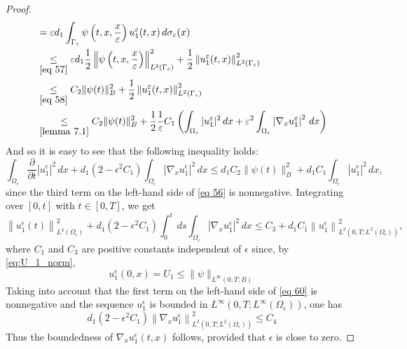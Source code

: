 \begin{proof}
\begin{equation*}
\begin{aligned}
    &=\epsilon d_{1} \int_{\Gamma_{\epsilon}} \psi\left(t, x, \frac{x}{\epsilon}\right) u_{1}^{\epsilon}(t, x) \, {d} \sigma_{\epsilon}(x) \\
    &\underset{\eqref{eq 57}}{\leq} \epsilon d_{1} \frac{1}{2}\left\|\psi\left(t, x, \frac{x}{\epsilon}\right)\right\|_{L^{2}\left(\Gamma_{\epsilon}\right)}^{2}+\frac{1}{2}\left\|u_{1}^{\epsilon}(t, x)\right\|_{L^{2}\left(\Gamma_{\epsilon}\right)}^{2} \\ 
    &\underset{\eqref{eq 58}}{\leq} C_{2}\|\psi(t)\|_{B}^{2} +\frac{1}{2}\left\|u_{1}^{\epsilon}(t, x)\right\|_{L^{2}\left(\Gamma_{\epsilon}\right)}^{2}\\
    &\underset{\eqref{lemma 7.1}}{\leq}  C_{2}\|\psi(t)\|_{B}^{2} + \frac{1}{2}\frac{1}{\epsilon}C_{1}\left( \int_{\Omega_{\epsilon}}|u_{1}^{\epsilon}|^{2} \, {d} x+{\epsilon^2}\int_{\Omega_{\epsilon}}\left|\nabla_{x} u_{1}^{\epsilon}\right|^{2} \, {d} x\right)
\end{aligned}
\end{equation*}
And so it is easy to see that the following inequality holds:
\begin{equation}
\int_{\Omega_{\epsilon}} \frac{\partial}{\partial t}\left|u_{1}^{\epsilon}\right|^{2} \, d  x+d_{1}\left(2-\epsilon^{2} C_{1}\right) \int_{\Omega_{\epsilon}}\left|\nabla_{x} u_{1}^{\epsilon}\right|^{2} \, {d} x\leq d_{1} C_{2}\|\psi(t)\|_{B}^{2}+d_{1} C_{1} \int_{\Omega_{\epsilon}}\left|u_{1}^{\epsilon}\right|^{2} \,{d} x,
\label{eq 59}\end{equation}
since the third term on the left-hand side of \eqref{eq 56} is nonnegative. Integrating over $[0, t]$ with $t \in[0, T]$, we get
\begin{equation}
  \left\|u_{1}^{\epsilon}(t)\right\|_{L^{2}\left(\Omega_{\epsilon}\right)}^{2}+d_{1}\left(2-\epsilon^{2} C_{1}\right) \int_{0}^{t} \, d  s \int_{\Omega_{\epsilon}}\left|\nabla_{x} u_{1}^{\epsilon}\right|^{2} \, d  x \leq C_{3}+d_{1} C_{1}\left\|u_{1}^{\epsilon}\right\|_{L^{2}\left(0, T ; L^{2}\left(\Omega_{\epsilon}\right)\right)}^{2},
\label{eq 60}\end{equation}
where $C_{1}$ and $C_{3}$ are positive constants independent of $\epsilon$ since, by \eqref{eq:U_1_norm},
$$
u_{1}^{\epsilon}(0, x)=U_{1} \leq\|\psi\|_{L^{\infty}(0, T ; B)}
$$
Taking into account that the first term on the left-hand side of \eqref{eq 60} is nonnegative and the sequence $u_{1}^{\epsilon}$ is bounded in $L^{\infty}\left(0, T ; L^{\infty}\left(\Omega_{\epsilon}\right)\right)$, one has
\begin{equation}
  d_{1}\left(2-\epsilon^{2} C_{1}\right)\left\|\nabla_{x} u_{1}^{\epsilon}\right\|_{L^{2}\left(0, T ; L^{2}\left(\Omega_{\epsilon}\right)\right)}^{2} \leq C_{4}
\label{eq 61}\end{equation}
Thus the boundedness of $\nabla_{x} u_{1}^{\epsilon}(t, x)$ follows, provided that $\epsilon$ is close to zero.
\end{proof} 
